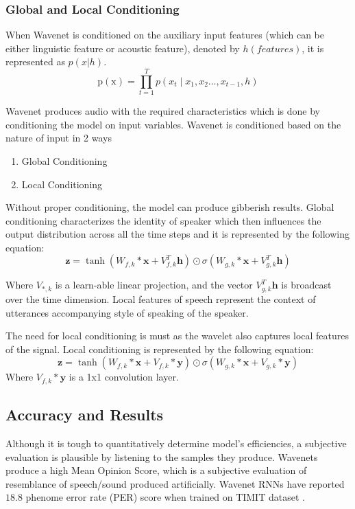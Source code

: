\documentclass[runningheads]{llncs}
\begin{document}
\subsubsection{Global and Local Conditioning}
When Wavenet is conditioned on the auxiliary input features (which can be either linguistic feature or acoustic feature), denoted by $h(features)$, it is represented as $p(x|h)$.
\begin{equation}
\mathrm{p}(\mathrm{x})=\prod_{t=1}^{T} p\left(x_{t} \mid x_{1}, x_{2} \ldots, x_{t-1}, h\right)
\end{equation}

Wavenet produces audio with the required characteristics which is done by conditioning the model on input variables. Wavenet is conditioned based on the nature of input in 2 ways 
\begin{enumerate}
\item Global Conditioning
\item Local Conditioning
\end{enumerate}
 Without proper conditioning, the model can produce gibberish results. Global conditioning characterizes the identity of speaker which then influences the output distribution across all the time steps and it is represented by the following equation:
\begin{equation}
\mathbf{z}=\tanh \left(W_{f, k} * \mathbf{x}+V_{f, k}^{T} \mathbf{h}\right) \odot \sigma\left(W_{g, k} * \mathbf{x}+V_{g, k}^{T} \mathbf{h}\right)
\end{equation}

Where $V_{*,k}$ is a learn-able linear projection, and the vector $V_{g, k}^{T} \mathbf{h}$ is broadcast over the time dimension. Local features of speech represent the context of utterances accompanying style of speaking of the speaker. 


The need for local conditioning is must as the wavelet also captures local features of the signal. 
Local conditioning is represented by the following equation:
\begin{equation}
\mathbf{z}=\tanh \left(W_{f, k} * \mathbf{x}+V_{f, k} * \mathbf{y}\right) \odot \sigma\left(W_{g, k} * \mathbf{x}+V_{g, k} * \mathbf{y}\right)
\end{equation}
Where $V_{f, k} * \mathbf{y}$ is a 1x1 convolution layer.

\subsection{Accuracy and Results}
Although it is tough  to quantitatively determine  model’s efficiencies, a subjective evaluation is plausible  by listening to the samples they produce\cite{ref_paper2}. Wavenets produce a high Mean Opinion Score, which is a subjective evaluation of resemblance of speech/sound produced artificially. 
Wavenet RNNs have reported $18.8$ phenome error rate (PER) score when trained on TIMIT dataset \cite{ref_paper2}. 
\end{document}
